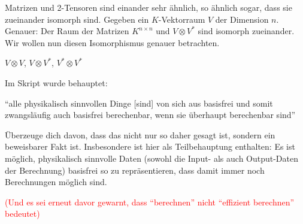 \begin{sheet}
\begin{problem}[title={Wiederholung von Isomorphie zwischen Vektorräumen: Matrix vs. 2-Tensor}]
	Matrizen und 2-Tensoren sind einander sehr ähnlich, so ähnlich sogar, dass sie zueinander isomorph sind. Gegeben ein $K$-Vektorraum $V$ der Dimension $n$. Genauer: Der Raum der Matrizen $K^{n\times n}$ und $V\otimes V^\ast$ sind isomorph zueinander. Wir wollen nun diesen Isomorphismus genauer betrachten.
	
$V\otimes V$, $V\otimes V^\ast$, $V^\ast \otimes V^\ast$
\end{problem}

\begin{problem}[title={Wilde Behauptungen}, difficulty={schwer}]
Im Skript wurde behauptet:

\enquote{alle physikalisch sinnvollen Dinge [sind] von sich aus basisfrei und somit zwangsläufig auch basisfrei berechenbar, wenn sie überhaupt berechenbar sind}

Überzeuge dich davon, dass das nicht nur so daher gesagt ist, sondern ein beweisbarer Fakt ist. Insbesondere ist hier als Teilbehauptung enthalten: Es ist möglich, physikalisch sinnvolle Daten (sowohl die Input- als auch Output-Daten der Berechnung) basisfrei so zu repräsentieren, dass damit immer noch Berechnungen möglich sind.

\medbreak
\textcolor{red}{(Und es sei erneut davor gewarnt, dass \enquote{berechnen} nicht \enquote{effizient berechnen} bedeutet)}
\end{problem}

\end{sheet}